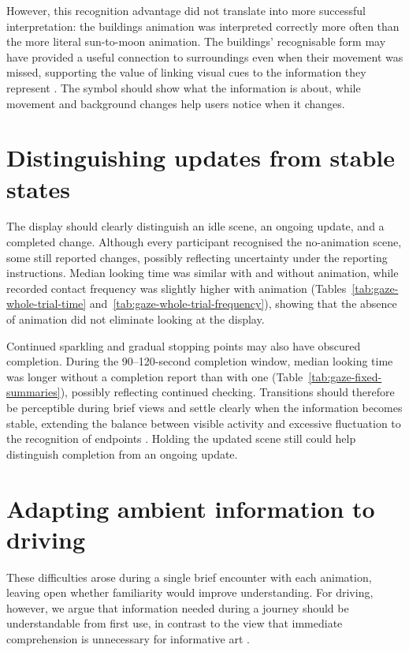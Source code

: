 \documentclass[
english,                 %
bibtex,                  %
includeExtraAbstracts, %
]{kththesis}
\numberwithin{listing}{chapter}
\begin{document}
However, this recognition advantage did not translate into more successful interpretation: the buildings animation was interpreted correctly more often than the more literal sun-to-moon animation. The buildings' recognisable form may have provided a useful connection to surroundings even when their movement was missed, supporting the value of linking visual cues to the information they represent \cite{skogAestheticsUtilityDesigning2003}. The symbol should show what the information is about, while movement and background changes help users notice when it changes.

\section{Distinguishing updates from stable states}
\label{sec:discussion-updates}

The display should clearly distinguish an idle scene, an ongoing update, and a completed change. Although every participant recognised the no-animation scene, some still reported changes, possibly reflecting uncertainty under the reporting instructions. Median looking time was similar with and without animation, while recorded contact frequency was slightly higher with animation (Tables~\ref{tab:gaze-whole-trial-time} and~\ref{tab:gaze-whole-trial-frequency}), showing that the absence of animation did not eliminate looking at the display.

Continued sparkling and gradual stopping points may also have obscured completion. During the 90--120-second completion window, median looking time was longer without a completion report than with one (Table~\ref{tab:gaze-fixed-summaries}), possibly reflecting continued checking. Transitions should therefore be perceptible during brief views and settle clearly when the information becomes stable, extending the balance between visible activity and excessive fluctuation to the recognition of endpoints \cite{skogAestheticsUtilityDesigning2003}. Holding the updated scene still could help distinguish completion from an ongoing update.

\section{Adapting ambient information to driving}
\label{sec:discussion-driving}

These difficulties arose during a single brief encounter with each animation, leaving open whether familiarity would improve understanding. For driving, however, we argue that information needed during a journey should be understandable from first use, in contrast to the view that immediate comprehension is unnecessary for informative art \cite{holmquistInformativeArtInformation2003}.
\end{document}

